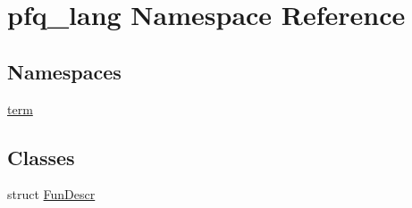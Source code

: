 \hypertarget{namespacepfq__lang}{\section{pfq\-\_\-lang Namespace Reference}
\label{namespacepfq__lang}
}
\subsection*{Namespaces}
\begin{DoxyCompactItemize}
\item 
\hyperlink{namespacepfq__lang_1_1term}{term}
\end{DoxyCompactItemize}
\subsection*{Classes}
\begin{DoxyCompactItemize}
\item 
struct \hyperlink{structpfq__lang_1_1FunDescr}{Fun\-Descr}
\end{DoxyCompactItemize}
